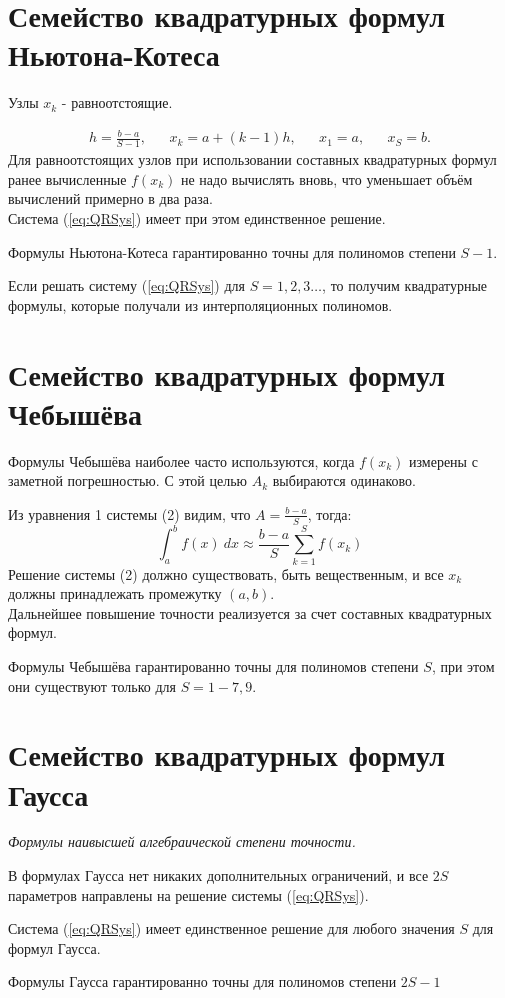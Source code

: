 \documentclass[a4paper,11pt]{article}
\begin{document}
\section{Семейство квадратурных формул Ньютона-Котеса}
\begin{importantblock}
  Узлы $x_k$ - равноотстоящие.
\end{importantblock}
\begin{align*}
  h = \frac{b-a}{S-1}, && x_k=a+(k-1)h, && x_1=a, && x_S=b.
\end{align*}
Для равноотстоящих узлов при использовании составных квадратурных формул ранее вычисленные $f(x_k)$ не надо вычислять вновь, что
уменьшает объём вычислений примерно в два раза. \\
Система (\ref{eq:QRSys}) имеет при этом единственное решение.
\begin{importantblock}
  Формулы Ньютона-Котеса гарантированно точны для полиномов степени $S-1$.
\end{importantblock}
Если решать систему (\ref{eq:QRSys}) для $S = 1, 2, 3\dots$, то получим квадратурные формулы, которые получали из интерполяционных полиномов.

\section{Семейство квадратурных формул Чебышёва}
\begin{importantblock}
  Формулы Чебышёва наиболее часто используются, когда $f(x_k)$ измерены с заметной погрешностью. С этой целью $A_k$ выбираются одинаково.
\end{importantblock}
Из уравнения 1 системы (2) видим, что $A = \frac{b-a}{S}$, тогда:
\[\int_a^b f(x)\ dx \approx \frac{b-a}{S} \sum_{k=1}^S f(x_k)\]
Решение системы (2) должно существовать, быть вещественным, и все $x_k$ должны принадлежать промежутку $(a, b)$. \\
Дальнейшее повышение точности реализуется за счет составных квадратурных формул.
\begin{importantblock}
  Формулы Чебышёва гарантированно точны для полиномов степени $S$, при этом они существуют только для $S = 1-7, 9$.
\end{importantblock}

\section{Семейство квадратурных формул Гаусса}
\textit{Формулы наивысшей алгебраической степени точности.}
\begin{importantblock}
  В формулах Гаусса нет никаких дополнительных ограничений, и все $2S$ параметров направлены на решение системы (\ref{eq:QRSys}).
\end{importantblock}
Система (\ref{eq:QRSys}) имеет единственное решение для любого значения $S$ для формул Гаусса.
\begin{importantblock}
  Формулы Гаусса гарантированно точны для полиномов степени $2S-1$
\end{importantblock}
\end{document}
